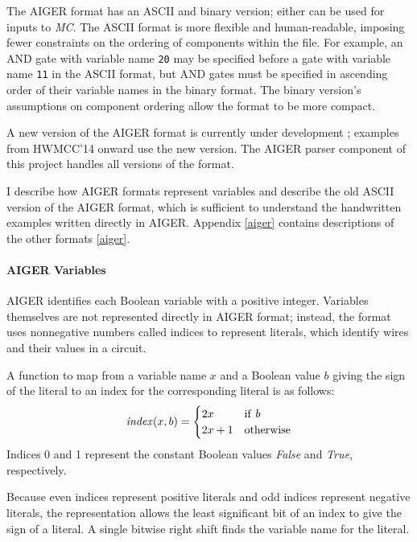 \documentclass[12pt,a4paper,twoside,openright]{report}
\begin{document}
{The AIGER format has an ASCII and binary version; either
can be used for inputs to \emph{MC}. The ASCII
format is more flexible and human-readable, imposing fewer constraints
on the ordering of components within the file. For example, an
AND gate with variable name {\tt 20} may be specified before a gate with
variable name {\tt 11} in the ASCII format, but AND gates must be specified in
ascending order of their variable names in the binary format.
The binary version's assumptions on component ordering allow the format
to be more compact.

A new version of the AIGER format is currently under development \cite{aiger};
examples from HWMCC'14 onward use the new version. The AIGER parser component
of this project handles all versions of the format.

I describe how AIGER formats represent variables
and describe the old ASCII version of the AIGER format, which
is sufficient to understand the handwritten examples written directly
in AIGER. Appendix \ref{aiger} contains descriptions of the other formats
\ref{aiger}.

\paragraph{AIGER Variables}{
AIGER identifies each Boolean variable with a positive integer.
Variables themselves are not represented directly in AIGER format; instead, the
format uses nonnegative numbers called indices to represent literals,
which identify wires and their values in a circuit.

A function to map from a variable name $x$ and a Boolean
value $b$ giving the sign of the literal to an index for
the corresponding literal is as follows:
$${\it index}(x, b) =
\begin{cases}
2x & {\rm if}~b \\
2x + 1 & {\rm otherwise}
\end{cases}$$
Indices 0 and 1 represent the constant Boolean values {\it False}
and {\it True}, respectively.

Because even indices represent positive literals and odd indices
represent negative literals, the representation allows
the least significant bit of an index to give the sign of a literal.
A single bitwise right shift finds the variable name for the literal.

}}
\end{document}
